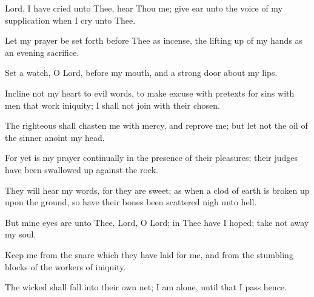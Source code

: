 Lord, I have cried unto Thee, hear Thou me; give ear unto the voice of my supplication when I cry unto Thee.

Let my prayer be set forth before Thee as incense, the lifting up of my hands as an evening sacrifice.

Set a watch, O Lord, before my mouth, and a strong door about my lips.

Incline not my heart to evil words, to make excuse with pretexts for sins with men that work iniquity; I shall not join with their chosen.

The righteous shall chasten me with mercy, and reprove me; but let not the oil of the sinner anoint my head.

For yet is my prayer continually in the presence of their pleasures; their judges have been swallowed up against the rock.

They will hear my words, for they are sweet; as when a clod of earth is broken up upon the ground, so have their bones been scattered nigh unto hell.

But mine eyes are unto Thee, Lord, O Lord; in Thee have I hoped; take not away my soul.

Keep me from the snare which they have laid for me, and from the stumbling blocks of the workers of iniquity.

The wicked shall fall into their own net; I am alone, until that I pass hence.

